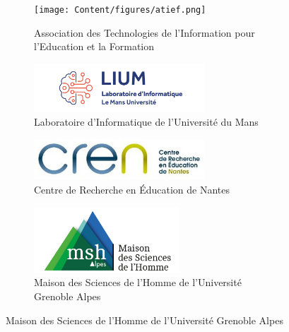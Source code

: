 \begin{figure}[!ht]
	\begin{subfigure}{0.4\textwidth}
            \centering
		\texttt{[image: Content/figures/atief.png]}
		\caption{Association des Technologies de l'Information pour l'Education et la Formation}
	\end{subfigure}
	\hfill
	\begin{subfigure}{0.4\textwidth}
            \centering
		\includegraphics[width=0.7\textwidth]{Content/figures/lium_logo.png}
		\caption{Laboratoire d'Informatique de l'Université du Mans}
	\end{subfigure}

	\vspace{0.08\textheight}
	
	\begin{subfigure}{0.4\textwidth}
            \centering
		\includegraphics[width=0.7\textwidth]{Content/figures/cren_logo.jpg}
		\caption{Centre de Recherche en Éducation de Nantes}
	\end{subfigure}
	\hfill
	\begin{subfigure}{0.4\textwidth}
            \centering
		\includegraphics[width=0.6\textwidth]{Content/figures/logo_msh.png}
		\caption{Maison des Sciences de l'Homme de l’Université Grenoble Alpes}
	\end{subfigure}

	\vspace{0.08\textheight}
	

\end{figure}
